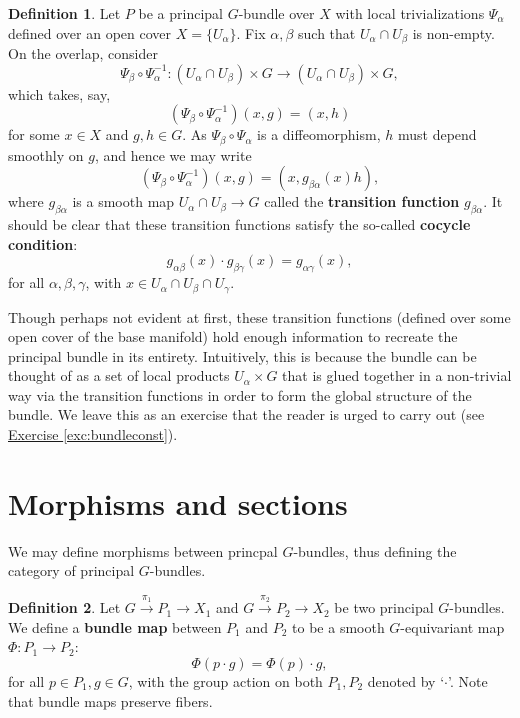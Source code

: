 \documentclass{book}
\theoremstyle{plain}
\theoremstyle{definition}
\newtheorem{defn}{Definition}
\theoremstyle{remark}
\begin{document}
\begin{defn}
    Let $P$ be a principal $G$-bundle over $X$ with local trivializations $\Psi_\alpha$ defined over an open cover $X=\{U_\alpha\}$.
    Fix $\alpha,\beta$ such that $U_\alpha\cap U_\beta$ is non-empty. 
    On the overlap, consider
    \[\Psi_\beta\circ\Psi_\alpha^{-1}:(U_\alpha\cap U_\beta)\times G\to (U_\alpha\cap U_\beta)\times G,\]
    which takes, say,
    \[(\Psi_\beta\circ\Psi_\alpha^{-1})(x,g)=(x,h)\]
    for some $x\in X$ and $g,h\in G$. As $\Psi_\beta\circ\Psi_\alpha$ is a diffeomorphism, $h$ must depend smoothly on $g$,
    and hence we may write
    \[(\Psi_\beta\circ\Psi_\alpha^{-1})(x,g)=(x,g_{\beta\alpha}(x)h),\]
    where $g_{\beta\alpha}$ is a smooth map $U_\alpha\cap U_\beta\to G$ called the \textbf{transition function} $g_{\beta\alpha}$. 
    It should be clear that these transition functions satisfy the so-called \textbf{cocycle condition}:
    \[g_{\alpha\beta}(x)\cdot g_{\beta\gamma}(x)=g_{\alpha\gamma}(x),\]
    for all $\alpha,\beta,\gamma$, with $x\in U_\alpha\cap U_\beta\cap U_\gamma$.
\end{defn}

Though perhaps not evident at first, these transition functions (defined over some open cover of the base manifold) hold enough
information to recreate the principal bundle in its entirety. Intuitively, this is because the bundle can be thought of
as a set of local products $U_\alpha\times G$ that is glued together in a non-trivial way via the transition functions in order to
form the global structure of the bundle. We leave this as an exercise that the reader is urged to carry out (see \hyperref[exc:bundleconst]{Exercise \ref*{exc:bundleconst}}).

\section{Morphisms and sections}

We may define morphisms between princpal $G$-bundles, thus defining the category of principal $G$-bundles.
\begin{defn}
    Let $G\overset{\pi_1}{\to}P_1\to X_1$ and $G\overset{\pi_2}{\to}P_2\to X_2$ be two principal $G$-bundles. We define a \textbf{bundle
    map} between $P_1$ and $P_2$ to be a smooth $G$-equivariant map $\Phi:P_1\to P_2$:
    \[\Phi(p\cdot g)=\Phi(p)\cdot g,\]
    for all $p\in P_1, g\in G$, with the group action on both $P_1,P_2$ denoted by `$\cdot$'. Note that bundle maps preserve fibers.
\end{defn}
\end{document}
